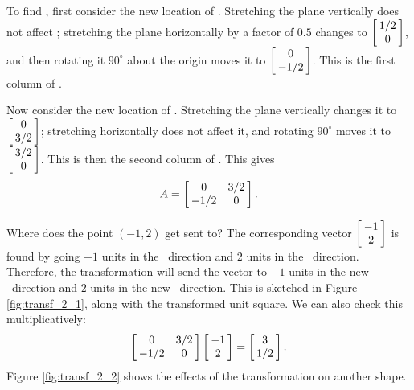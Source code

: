 {To find \tta, first consider the new location of \veone. Stretching the plane vertically does not affect \veone; stretching the plane horizontally by a factor of $0.5$ changes \veone to $\bmx{c} 1/2\\0\emx$, and then rotating it $90^\circ$ about the origin moves it to $\bmx{c} 0\\-1/2\emx$. This is the first column of \tta. 

Now consider the new location of \vetwo. Stretching the plane vertically changes it to $\bmx{c} 0\\ 3/2\emx$; stretching horizontally does not affect it, and rotating $90^\circ$ moves it to $\bmx{c} 3/2\\0\emx$. This is then the second column of \tta. This gives $$\tta = \bmx{cc} 0 & 3/2 \\ -1/2 & 0 \emx.$$

Where does the point $(-1,2)$ get sent to? The corresponding vector $\bmx{c}-1\\2\emx$ is found by going $-1$ units in the \veone\ direction and $2$ units in the \vetwo\ direction. Therefore, the transformation will send the vector to $-1$ units in the new \veone\ direction and $2$ units in the new \vetwo\ direction. This is sketched in Figure \ref{fig:transf_2_1}, along with the transformed unit square. We can also check this multiplicatively: $$\bmx{cc} 0 & 3/2 \\ -1/2 & 0 \emx \bmx{c}-1\\2\emx = \bmx{c} 3\\1/2\emx.$$ Figure \ref{fig:transf_2_2} shows the effects of the transformation on another shape.

\begin{myfigure}
\begin{center}
\end{center}
\label{fig:transf_2_1}
\end{myfigure}

}
